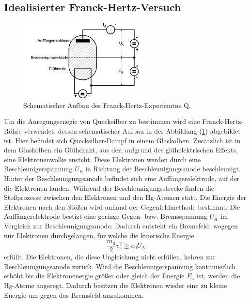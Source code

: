 \subsection{Idealisierter Franck-Hertz-Versuch}
\label{sec:Idealisierter}
\begin{figure}[h]
  \centering
  \includegraphics[width=0.6\textwidth]{content/Bilder/schematischerAufbau.png}
  \caption{Schematischer Aufbau des Franck-Hertz-Experiemtns Q\cite{anleitungV601}.}
  \label{fig:schematischerAufbau}
\end{figure}
Um die Anregungsenegie von Quecksilber zu bestimmen wird eine Franck-Hertz-Röhre verwendet, dessen schematischer Aufbau in der Abbildung (\ref{fig:schematischerAufbau})
abgebildet ist. Hier befindet sich Quecksilber-Dampf in einem Glaskolben. Zusätzlich ist in dem Glaskolben ein Glühdraht, aus der, aufgrund des glühelektrischen Effekts, eine 
Elektronenwolke ensteht. Diese Elektronen werden durch eine Beschleunigerspannung $U_{\text{B}}$ in Richtung der Beschleunigungsanode beschleunigt. Hinter der Beschleunigungsanode
befindet sich eine Auffängerelektrode, auf der die Elektronen landen. Während der Beschleunigungsstrecke finden die Stoßprozesse zwischen den Elektronen und den Hg-Atomen statt. 
Die Energie der Elektronen nach den Stößen wird anhand der Gegenfeldmethode bestimmt. Die Auffängerelektrode bestizt eine geringe Gegen- bzw. Bremsspannung $U_{\text{A}}$ im Vergleich zur Beschleunigungsanode.
Dadurch entsteht ein Bremsfeld, wogegen nur Elektronen durchgelangen, für welche die kinetische Energie
\begin{equation}
  \frac{m_0}{2} v_z^2 \geq e_0 U_{\text{A}}
  \label{eqn:kinetischeEnergieUngleichung}
\end{equation}
erfüllt. Die Elektronen, die diese Ungleichung nicht erfüllen, kehren zur Beschleunigungsanode zurück. Wird die Beschleunigerspannung kontinuierlich erhöht bis die Elektronenergie
größer oder gleich der Energie $E_{\text{a}}$ ist, werden die Hg-Atome angeregt. Dadurch besitzen die Elektronen wieder eine zu kleine Energie um gegen das Bremsfeld anzukommen.
